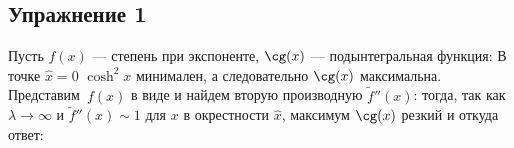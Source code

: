 \def \picdir{pic/}

\subsection*{Упражнение 1}
Пусть $f(x)$ --- степень при экспоненте, $\cg(x)$ --- подынтегральная функция:
В точке $\hat{x} = 0$ $\cosh^2{x}$ минимален, а следовательно $\cg(x)$ максимальна. Представим\
$f(x)$ в виде
и найдем вторую производную $\tilde{f}''(x)$:
тогда, так как $\lambda \rightarrow \infty$ и $\tilde{f}''(x) \sim 1$ для $x$ в окрестности $\hat{x}$, максимум $\cg(x)$ резкий и
откуда ответ:
